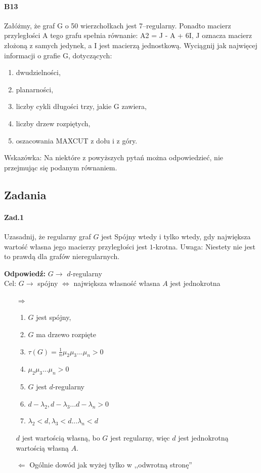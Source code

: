 \paragraph{B13} Załóżmy, że graf G o 50 wierzchołkach jest 7–regularny. Ponadto macierz przyległości A tego grafu spełnia równanie: A2 = J - A + 6I,
J oznacza macierz złożoną z samych jedynek, a I jest macierzą jednostkową. Wyciągnij jak najwięcej informacji o grafie G, dotyczących:
\begin{enumerate}[label=\alph*)]
\item dwudzielności,
\item planarności,
\item liczby cykli długości trzy, jakie G zawiera,
\item liczby drzew rozpiętych,
\item oszacowania MAXCUT z dołu i z góry.
\end{enumerate}
Wskazówka: Na niektóre z powyższych pytań można odpowiedzieć, nie przejmując się podanym równaniem.

\subsection{Zadania}
\paragraph{Zad.1} Uzasadnij, że regularny graf $G$ jest Spójny wtedy i tylko wtedy, gdy największa wartość własna jego macierzy przyległości jest $1$-krotna. Uwaga: Niestety nie jest to prawdą dla grafów nieregularnych.

\textbf{Odpowiedź: } $G\rightarrow $ $d$-regularny\\
Cel: $G\rightarrow$ spójny $\Leftrightarrow$ największa własność własna $A$ jest jednokrotna
\begin{itemize}
\item[$\Rightarrow$]
\begin{enumerate}
\item $G$ jest spójny,
\item $G$ ma drzewo rozpięte
\item $\tau (G)=\frac{1}{n}\mu_2\mu_3...\mu_n>0$
\item $\mu_2\mu_3...\mu_n>0$
\item $G$ jest $d$-regularny
\item $d-\lambda _2, d-\lambda _3...d-\lambda _n>0$
\item $\lambda _2 < d, \lambda _3<d...\lambda _n<d$
\end{enumerate}
$d$ jest wartością własną, bo $G$ jest regularny, więc $d$ jest jednokrotną wartością własną $A$.
\item[$\Leftarrow$] Ogólnie dowód jak wyżej tylko w ,,odwrotną stronę''
\end{itemize}
